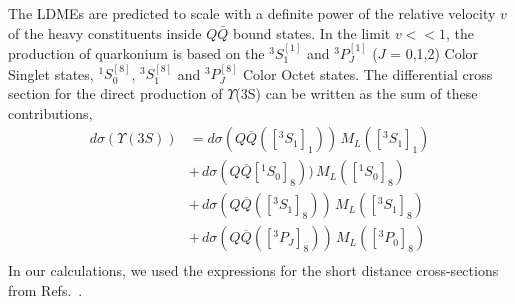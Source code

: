 \documentclass[twocolumn,amsmath,amssymb]{snp}
\begin{document}
The LDMEs are predicted to scale with a definite power of the relative velocity $v$ of the heavy constituents 
inside $Q\bar Q$ bound states. In the limit $v<<1$, the production of quarkonium is based on the $^3S_1^{[1]}$ 
and $^3P_J^{[1]}$ ($J$ = 0,1,2) Color Singlet states, $^1S_0^{[8]}$, $^3S_1^{[8]}$ and $^3P_J^{[8]}$ Color 
Octet states.  The differential cross section for the direct production of $\Upsilon$(3S) can be written as the 
sum of these contributions,
\begin{eqnarray}
d\sigma(\Upsilon(3S)) &= d\sigma(Q\overline{Q}([^3S_1]_{1}))
                   \,M_{L}([^3S_1]_{1}) \nonumber \\
                &+\, d\sigma(Q\overline{Q}[^1S_0]_{8}))
                   \,M_{L}([^1S_0]_{8}) \nonumber \\ 
                &+ \, d\sigma(Q\overline{Q}([^3S_1]_{8}))
                   \,M_{L}([^3S_1]_{8}) \nonumber \\
                &+ \, d\sigma(Q\overline{Q}([^3P_J]_{8}))
                   \,M_{L}([^3P_0]_{8})\nonumber \\ \nonumber
\label{eq:dsigmaJ}
\end{eqnarray}
In our calculations, we used the expressions for the short distance cross-sections 
from Refs.~\cite{Baier:1983va,Cho:1995vh}.
\end{document}
